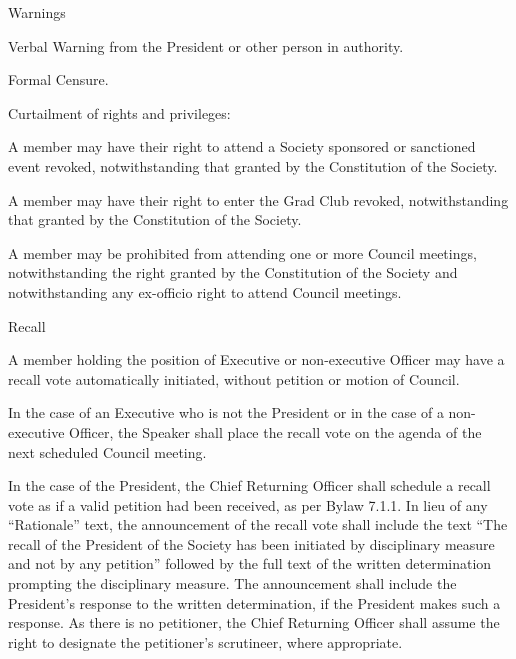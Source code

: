 \begin{longenum}[ label*=\thesubsection.\arabic*., align=left]
	\item Warnings
    \begin{longenum}[ label*=\arabic*., align=left]
		\item Verbal Warning from the President or other person in authority.
        \item Formal Censure.
	\end{longenum}
    \item Curtailment of rights and privileges:
    \begin{longenum}[ label*=\arabic*., align=left]
		\item A member may have their right to attend a Society sponsored or sanctioned event revoked, notwithstanding that granted by the Constitution of the Society.
        \item A member may have their right to enter the Grad Club revoked, notwithstanding that granted by the Constitution of the Society.
        \item A member may be prohibited from attending one or more Council meetings, notwithstanding the right granted by the Constitution of the Society and notwithstanding any ex-officio right to attend Council meetings.
	\end{longenum}
    \item Recall
    \begin{longenum}[ label*=\arabic*., align=left]
		\item A member holding the position of Executive or non-executive Officer may have a recall vote automatically initiated, without petition or motion of Council.
        \item In the case of an Executive who is not the President or in the case of a non-executive Officer, the Speaker shall place the recall vote on the agenda of the next scheduled Council meeting.
        \item In the case of the President, the Chief Returning Officer shall schedule a recall vote as if a valid petition had been received, as per Bylaw 7.1.1. In lieu of any ``Rationale'' text, the announcement of the recall vote shall include the text ``The recall of the President of the Society has been initiated by disciplinary measure and not by any petition'' followed by the full text of the written determination prompting the disciplinary measure. The announcement shall include the President's response to the written determination, if the President makes such a response. As there is no petitioner, the Chief Returning Officer shall assume the right to designate the petitioner's scrutineer, where appropriate.

\end{longenum}
\end{longenum}
